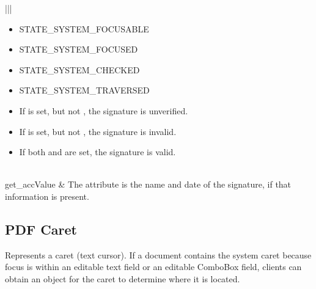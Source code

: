\documentclass[letterpaper,12pt,english,openany,oneside]{sphinxmanual}
\begin{document}
\begin{savenotes}
\begin{tabular}[t]{|*{2}{|}}
\begin{itemize}
\item {} 
STATE\_SYSTEM\_FOCUSABLE

\item {} 
STATE\_SYSTEM\_FOCUSED

\item {} 
STATE\_SYSTEM\_CHECKED

\item {} 
STATE\_SYSTEM\_TRAVERSED

\end{itemize}
\begin{itemize}
\item {} 
If  is set, but not  , the signature is unverified.

\item {} 
If  is set, but not  , the signature is invalid.

\item {} 
If both  and  are set, the signature is valid.

\end{itemize}
\\
\hline
get\_accValue
&
The  attribute is the name and date of the signature, if that information is present.
\\
\hline
\end{tabular}
\par
\sphinxattableend\end{savenotes}




\subsection{PDF Caret}
\label{\detokenize{MSAA_PDF:pdf-caret}}
Represents a caret (text cursor). If a document contains the system caret because focus is within an editable text field or an editable ComboBox field, clients can obtain an  object for the caret to determine where it is located.
\end{document}
